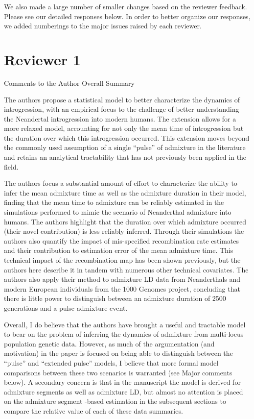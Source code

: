 \documentclass[11pt]{article}
\begin{document}
We also made a large number of smaller changes based on the reviewer feedback. Please see our detailed responses below. In order to better organize our responses, we added numberings to the major issues raised by each reviewer.

\section{Reviewer 1}\label{Reviewer 1}
Comments to the Author
Overall Summary 

The authors propose a statistical model to better characterize the dynamics of introgression, with an empirical focus to the challenge of better understanding the Neandertal introgression into modern humans. The extension allows for a more relaxed model, accounting for not only the mean time of introgression but the duration over which this introgression occurred. This extension moves beyond the commonly used assumption of a single “pulse” of admixture in the literature and retains an analytical tractability that has not previously been applied in the field. 

The authors focus a substantial amount of effort to characterize the ability to infer the mean admixture time as well as the admixture duration in their model, finding that the mean time to admixture can be reliably estimated in the simulations performed to mimic the scenario of Neanderthal admixture into humans. The authors highlight that the duration over which admixture occurred (their novel contribution) is less reliably inferred. Through their simulations the authors also quantify the impact of mis-specified recombination rate estimates and their contribution to estimation error of the mean admixture time. This technical impact of the recombination map has been shown previously, but the authors here describe it in tandem with numerous other technical covariates.  The authors also apply their method to admixture LD data from Neanderthals and modern European individuals from the 1000 Genomes project,  concluding that there is little power to distinguish between an admixture duration of 2500 generations and a pulse admixture event. 

Overall, I do believe that the authors have brought a useful and tractable model to bear on the problem of inferring the dynamics of admixture from multi-locus population genetic data. However, as much of the argumentation (and motivation) in the paper is focused on being able to distinguish between the “pulse” and “extended pulse” models, I believe that more formal model comparisons between these two scenarios is warranted (see Major comments below). A secondary concern is that in the manuscript the model is derived for admixture segments as well as admixture LD, but almost no attention is placed on the admixture segment -based estimation in the subsequent sections to compare the relative value of each of these data summaries.
\end{document}
